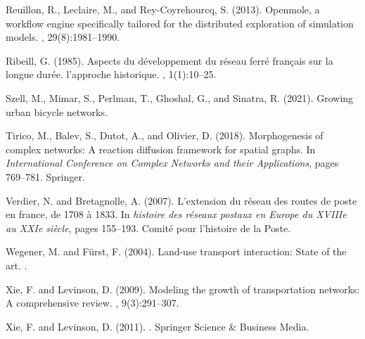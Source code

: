 \documentclass{article}
\begin{document}
\begin{thebibliography}{}
Reuillon, R., Leclaire, M., and Rey-Coyrehourcq, S. (2013).
\newblock Openmole, a workflow engine specifically tailored for the distributed
  exploration of simulation models.
, 29(8):1981--1990.

Ribeill, G. (1985).
\newblock Aspects du d{\'e}veloppement du r{\'e}seau ferr{\'e} fran{\c{c}}ais
  sur la longue dur{\'e}e. l'approche historique.
, 1(1):10--25.

Szell, M., Mimar, S., Perlman, T., Ghoshal, G., and Sinatra, R. (2021).
\newblock Growing urban bicycle networks.

Tirico, M., Balev, S., Dutot, A., and Olivier, D. (2018).
\newblock Morphogenesis of complex networks: A reaction diffusion framework for
  spatial graphs.
\newblock In {\em International Conference on Complex Networks and their
  Applications}, pages 769--781. Springer.

Verdier, N. and Bretagnolle, A. (2007).
\newblock L'extension du r{\'e}seau des routes de poste en france, de 1708
  {\`a} 1833.
\newblock In {\em histoire des r{\'e}seaux postaux en Europe du XVIIIe au XXIe
  si{\`e}cle}, pages 155--193. Comit{\'e} pour l'histoire de la Poste.

Wegener, M. and F{\"u}rst, F. (2004).
\newblock Land-use transport interaction: State of the art.
.

Xie, F. and Levinson, D. (2009).
\newblock Modeling the growth of transportation networks: A comprehensive
  review.
, 9(3):291--307.

Xie, F. and Levinson, D. (2011).
.
\newblock Springer Science \& Business Media.

\end{thebibliography}
\end{document}
